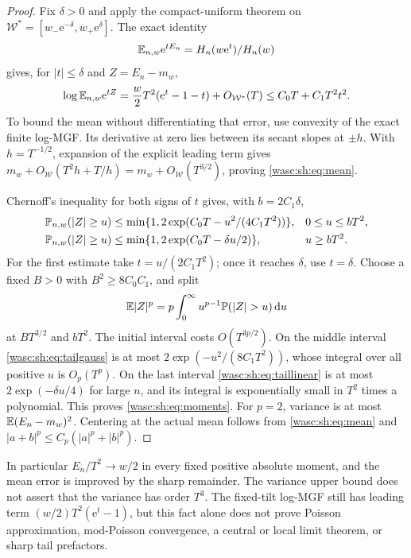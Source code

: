 \documentclass[11pt,a4paper]{article}
\theoremstyle{remark}\newtheorem{remark}[theorem]{Remark}
\newcommand{\dd}{\,\mathrm d}\newcommand{\ee}{\mathrm e}\newcommand{\Wc}{\mathcal W}
\numberwithin{equation}{section}
\begin{document}
\begin{proof}
Fix $\delta>0$ and apply the compact-uniform theorem on
$\Wc^*=[w_-\ee^{-\delta},w_+\ee^{\delta}]$. The exact identity
\[
\E_{n,w}\ee^{tE_n}=H_n(w\ee^t)/H_n(w)
\]
gives, for $|t|\le\delta$ and $Z=E_n-m_w$,
\begin{equation}\label{wasc:sh:eq:centermgf}
\log\E_{n,w}\ee^{tZ}
=\frac w2T^2(\ee^t-1-t)+O_{\Wc^*}(T)
\le C_0T+C_1T^2t^2.
\end{equation}
To bound the mean without differentiating that error, use convexity of the exact finite log-MGF. Its derivative at zero lies between its secant slopes at $\pm h$. With $h=T^{-1/2}$, expansion of the explicit leading term gives
$m_w+O_{\Wc}(T^2h+T/h)=m_w+O_{\Wc}(T^{3/2})$, proving \eqref{wasc:sh:eq:mean}.

Chernoff's inequality for both signs of $t$ gives, with $b=2C_1\delta$,
\begin{align}
\mathbb P_{n,w}(|Z|\ge u)&\le\min\{1,2\exp(C_0T-u^2/(4C_1T^2))\},
&&0\le u\le bT^2,\label{wasc:sh:eq:tailgauss}\\
\mathbb P_{n,w}(|Z|\ge u)&\le\min\{1,2\exp(C_0T-\delta u/2)\},
&&u\ge bT^2.\label{wasc:sh:eq:taillinear}
\end{align}
For the first estimate take $t=u/(2C_1T^2)$; once it reaches $\delta$, use $t=\delta$. Choose a fixed $B>0$ with $B^2\ge8C_0C_1$, and split
\[
\E|Z|^p=p\int_0^\infty u^{p-1}\Prob(|Z|>u)\dd u
\]
at $BT^{3/2}$ and $bT^2$. The initial interval costs $O(T^{3p/2})$. On the middle interval \eqref{wasc:sh:eq:tailgauss} is at most $2\exp(-u^2/(8C_1T^2))$, whose integral over all positive $u$ is $O_p(T^p)$. On the last interval \eqref{wasc:sh:eq:taillinear} is at most $2\exp(-\delta u/4)$ for large $n$, and its integral is exponentially small in $T^2$ times a polynomial. This proves \eqref{wasc:sh:eq:moments}. For $p=2$, variance is at most $\mathbb E(E_n-m_w)^2$. Centering at the actual mean follows from \eqref{wasc:sh:eq:mean} and $|a+b|^p\le C_p(|a|^p+|b|^p)$.
\end{proof}

In particular $E_n/T^2\to w/2$ in every fixed positive absolute moment, and the mean error is improved by the sharp remainder. The variance upper bound does not assert that the variance has order $T^3$. The fixed-tilt log-MGF still has leading term $(w/2)T^2(\ee^t-1)$, but this fact alone does not prove Poisson approximation, mod-Poisson convergence, a central or local limit theorem, or sharp tail prefactors.
\end{document}
